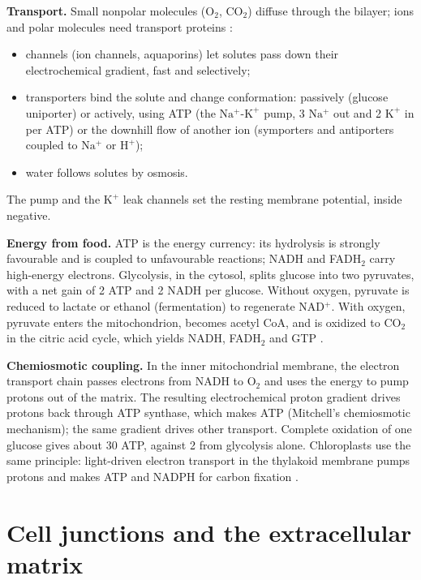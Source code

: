 \textbf{Transport.}
Small nonpolar molecules ($\mathrm{O_2}$,
$\mathrm{CO_2}$) diffuse through the bilayer;
ions and polar molecules need transport
proteins \cite[Chapter
12]{alberts2014essential}:
\begin{itemize}
\item channels (ion channels, aquaporins) let
solutes pass down their electrochemical
gradient, fast and selectively;
\item transporters bind the solute and change
conformation: passively (glucose uniporter)
or actively, using ATP (the
$\mathrm{Na^+}$-$\mathrm{K^+}$ pump, 3
$\mathrm{Na^+}$ out and 2 $\mathrm{K^+}$ in
per ATP) or the downhill flow of another ion
(symporters and antiporters coupled to
$\mathrm{Na^+}$ or $\mathrm{H^+}$);
\item water follows solutes by osmosis.
\end{itemize}
The pump and the $\mathrm{K^+}$ leak channels
set the resting membrane potential, inside
negative.

\textbf{Energy from food.}
ATP is the energy currency: its hydrolysis is
strongly favourable and is coupled to
unfavourable reactions; NADH and FADH$_2$
carry high-energy electrons. Glycolysis, in
the cytosol, splits glucose into two
pyruvates, with a net gain of 2 ATP and 2
NADH per glucose. Without oxygen, pyruvate is
reduced to lactate or ethanol (fermentation)
to regenerate NAD$^+$. With oxygen, pyruvate
enters the mitochondrion, becomes acetyl CoA,
and is oxidized to $\mathrm{CO_2}$ in the
citric acid cycle, which yields NADH,
FADH$_2$ and GTP \cite[Chapter
13]{alberts2014essential}.

\textbf{Chemiosmotic coupling.}
In the inner mitochondrial membrane, the
electron transport chain passes electrons
from NADH to $\mathrm{O_2}$ and uses the
energy to pump protons out of the matrix. The
resulting electrochemical proton gradient
drives protons back through ATP synthase,
which makes ATP (Mitchell's chemiosmotic
mechanism); the same gradient drives other
transport. Complete oxidation of one glucose
gives about 30 ATP, against 2 from glycolysis
alone. Chloroplasts use the same principle:
light-driven electron transport in the
thylakoid membrane pumps protons and makes
ATP and NADPH for carbon fixation
\cite[Chapter 14]{alberts2014essential}.

\section{Cell junctions and the extracellular
matrix}
\label{section-mcb-junctions}

